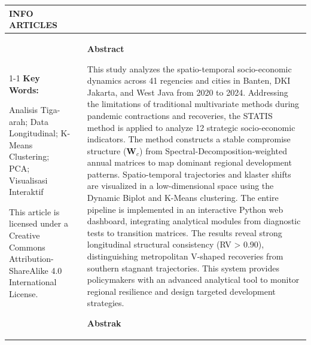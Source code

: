 \documentclass[10pt, a4paper]{article}
\begin{document}
\noindent
\begingroup
\small %
\begin{tabular}{@{} p{} @{} p{} @{} p{} @{}}
\hline
\rule{0pt}{2.5ex}%
\textbf{INFO ARTICLES} & & \\
\cline{1-1}
\textbf{Key Words:} \par \vspace{0.4em}
Analisis Tiga-arah; Data Longitudinal; K-Means Clustering; PCA; Visualisasi Interaktif \par \vspace{2em}
This article is licensed under a Creative Commons Attribution-ShareAlike 4.0 International License.
& &
\textbf{Abstract} \par \vspace{0.4em}
This study analyzes the spatio-temporal socio-economic dynamics across 41 regencies and cities in Banten, DKI Jakarta, and West Java from 2020 to 2024. Addressing the limitations of traditional multivariate methods during pandemic contractions and recoveries, the STATIS method is applied to analyze 12 strategic socio-economic indicators. The method constructs a stable compromise structure ($\mathbf{W}_c$) from Spectral-Decomposition-weighted annual matrices to map dominant regional development patterns. Spatio-temporal trajectories and klaster shifts are visualized in a low-dimensional space using the Dynamic Biplot and K-Means clustering. The entire pipeline is implemented in an interactive Python web dashboard, integrating analytical modules from diagnostic tests to transition matrices. The results reveal strong longitudinal structural consistency (RV > 0.90), distinguishing metropolitan V-shaped recoveries from southern stagnant trajectories. This system provides policymakers with an advanced analytical tool to monitor regional resilience and design targeted development strategies. \par \vspace{1.5em}
\textbf{Abstrak} \par \vspace{0.4em}

\end{tabular}
\end{document}
